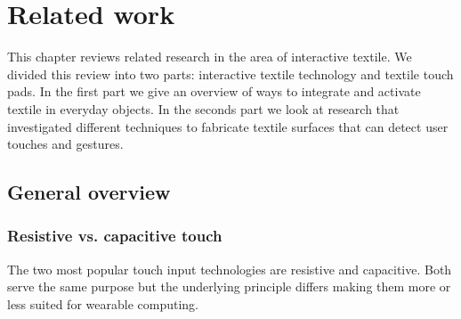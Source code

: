 %

\chapter{Related work}
\label{relatedwork}
This chapter reviews related research in the area of interactive textile. We divided this review into two parts: interactive textile technology and textile touch pads. In the first part we give an overview of ways to integrate and activate textile in everyday objects. In the seconds part we look at research that investigated different techniques to fabricate textile surfaces that can detect user touches and gestures.

\section{General overview}
\subsection{Resistive vs. capacitive touch}
The two most popular touch input technologies are resistive and capacitive. Both serve the same purpose but the underlying principle differs making them more or less suited for wearable computing. 

